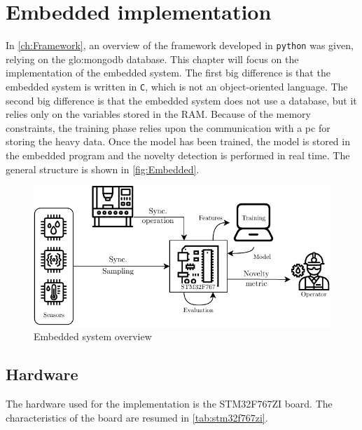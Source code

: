 \chapter{Embedded implementation}
\label{ch:Embedded}
In \autoref{ch:Framework}, an overview of the framework developed in \texttt{python} was given, relying on the \gls{glo:mongodb} database. This chapter will focus on the implementation of the embedded system. The first big difference is that the embedded system is written in \texttt{C}, which is not an object-oriented language. The second big difference is that the embedded system does not use a database, but it relies only on the variables stored in the RAM. Because of the memory constraints, the training phase relies upon the communication with a \gls{pc} for storing the heavy data. Once the model has been trained, the model is stored in the embedded program and the novelty detection is performed in real time. The general structure is shown in \autoref{fig:Embedded}.

\begin{figure}
    \centering
    \includegraphics[scale=1]{images/Embedded/EmbeddedStructure.pdf}
    \caption{Embedded system overview}
    \label{fig:Embedded}
\end{figure}


\section{Hardware}
The hardware used for the implementation is the STM32F767ZI board. The characteristics of the board are resumed in \autoref{tab:stm32f767zi}.


